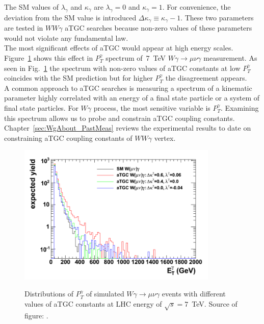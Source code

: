 The SM values of $\lambda_\gamma$ and $\kappa_\gamma$ are $\lambda_\gamma=0$ and $\kappa_\gamma=1$. For convenience, the deviation from the SM value is introduced $\Delta \kappa_\gamma \equiv \kappa_\gamma-1$. These two parameters are tested in $WW\gamma$ aTGC searches because non-zero values of these parameters would not violate any fundamental law.\\

The most significant effects of aTGC would appear at high energy scales. Figure~\ref{fig:aTGC_Pt_Wg} shows this effect in $P_T^\gamma$ spectrum of~7~TeV $W\gamma \rightarrow \mu\nu\gamma$ measurement. As seen in Fig.~\ref{fig:aTGC_Pt_Wg} the spectrum with non-zero values of aTGC constants at low $P_T^{\gamma}$ coincides with the SM prediction but for higher $P_T^{\gamma}$ the disagreement appears.\\

A common approach to aTGC searches is measuring a spectrum of a kinematic parameter highly correlated with an energy of a final state particle or a system of final state particles. For $W\gamma$ process, the most sensitive variable is $P_T^\gamma$. Examining this spectrum allows us to probe and constrain aTGC coupling constants. Chapter~\ref{sec:WgAbout_PastMeas} reviews the experimental results to date on constraining aTGC coupling constants of $WW\gamma$ vertex.\\ 

\begin{figure}[htb]
  \begin{center}
    {\includegraphics[width=0.85\textwidth]{../figs/WgAbout/aTGC_Pt_Wg.png}}
    \caption{Distributions of $P_T^\gamma$ of simulated $W\gamma\rightarrow\mu\nu\gamma$ events with different values of aTGC constants at LHC energy of $\sqrt{s}=7$~TeV. Source of figure:  \cite{ref_Senka_thesis}.}
    \label{fig:aTGC_Pt_Wg}
  \end{center}
\end{figure}

